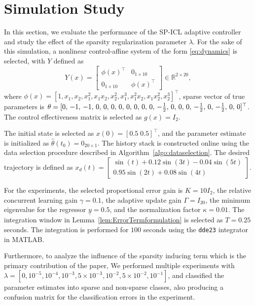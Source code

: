 \documentclass[conference]{ieeeconf}
\begin{document}
\section{Simulation Study}

In this section, we evaluate the performance of the SP-ICL adaptive controller and study the effect of the sparsity regularization parameter $\lambda$. For the sake of this simulation, a nonlinear control-affine system of the form \eqref{eq:dynamics} is selected, with $Y$ defined as %
\begin{equation}
Y(x)=
\begin{bmatrix}
\phi(x)^\top & 0_{1\times10}\\
0_{1\times10} & \phi(x)^\top
\end{bmatrix}\in\mathbb{R}^{2\times20},
\end{equation}
where $\phi(x)=[1,x_1,x_2,x_1^2,x_1x_2,x_2^2,x_1^3,x_1^2x_2,x_1x_2^2,x_2^3]^{\!\top}$, sparse vector of true parameters is  $\theta = [0,\,-1,\,-1,\,0,\,0,\,0,\,0,\,0,\,0,\,0,\,
0,\,-\tfrac{1}{2},\,0,\,0,\,0,\,-\tfrac{1}{2},\,0,\,-\tfrac{1}{2}\\ ,\,0,\,0]^\top$. The control effectiveness matrix is selected as $g(x)=I_2$. 

The initial state is selected as $x(0) = [0.5\;0.5]^\top$, and the parameter estimate is initialized as $\hat{\theta}(t_{0}) = 0_{20 \times 1}$. The history stack is constructed online using the data selection procedure described in Algorithm~\ref{algo:dataselection}. The desired trajectory is defined as $x_d(t) = \begin{bmatrix} \sin(t)+0.12\sin(3t)-0.04\sin(5t) \\ 0.95\sin(2t)+0.08\sin(4t) \end{bmatrix}$. 

For the experiments, the selected proportional error gain is $K=10I_2$, the relative concurrent learning gain  $\gamma=0.1$, the adaptive update gain $\Gamma= I_{20}$, the minimum eigenvalue for the regressor  $\underline{y}=0.5$, and the normalization factor $\kappa= 0.01$. The integration window in Lemma~\ref{lem:ErrorTermformulation} is selected as $ T = 0.25$ seconds. The integration is performed for $100$ seconds using the \texttt{dde23} integrator in MATLAB.

Furthermore, to analyze the influence of the sparsity inducing term which is the primary contribution of the paper, We performed multiple experiments with $\lambda=[0, 10^{-5}, 10^{-4}, 10^{-3},5 \times 10^{-3}, 10^{-2}, 5\times 10^{-2}, 10^{-1}]$, and classified the parameter estimates into sparse and non-sparse classes, also producing a confusion matrix for the classification errors in the experiment.
\end{document}

